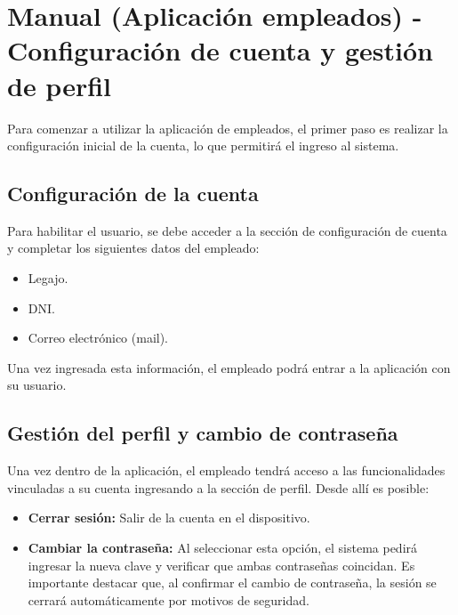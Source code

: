 \section{Manual (Aplicación empleados) - Configuración de cuenta y gestión de perfil}

Para comenzar a utilizar la aplicación de empleados, el primer paso es realizar la configuración inicial de la cuenta, lo que permitirá el ingreso al sistema.

\subsection{Configuración de la cuenta}
Para habilitar el usuario, se debe acceder a la sección de configuración de cuenta y completar los siguientes datos del empleado:
\begin{itemize}
    \item Legajo.
    \item DNI.
    \item Correo electrónico (mail).
\end{itemize}
Una vez ingresada esta información, el empleado podrá entrar a la aplicación con su usuario.

\subsection{Gestión del perfil y cambio de contraseña}
Una vez dentro de la aplicación, el empleado tendrá acceso a las funcionalidades vinculadas a su cuenta ingresando a la sección de perfil. Desde allí es posible:
\begin{itemize}
    \item \textbf{Cerrar sesión:} Salir de la cuenta en el dispositivo.
    \item \textbf{Cambiar la contraseña:} Al seleccionar esta opción, el sistema pedirá ingresar la nueva clave y verificar que ambas contraseñas coincidan. Es importante destacar que, al confirmar el cambio de contraseña, la sesión se cerrará automáticamente por motivos de seguridad.
\end{itemize}
